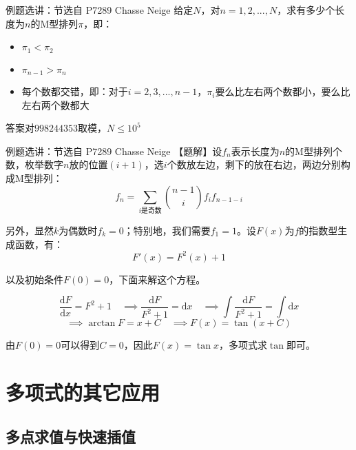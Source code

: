 \documentclass{beamer}
\begin{document}
\begin{frame}{例题选讲：节选自 P7289 Chasse Neige}
    \small
    给定$N$，对$n=1,2,...,N$，求有多少个长度为$n$的M型排列$\pi$，即：
    \begin{itemize}
        \item $\pi_1<\pi_2$
        \item $\pi_{n-1}>\pi_n$
        \item 每个数都交错，即：对于$i=2,3,...,n-1$，$\pi_i$要么比左右两个数都小，要么比左右两个数都大
    \end{itemize}

    答案对$998244353$取模，$N\leq 10^5$
\end{frame}

\begin{frame}{例题选讲：节选自 P7289 Chasse Neige}
    \small
    【题解】设$f_n$表示长度为$n$的M型排列个数\pause，枚举数字$n$放的位置$(i+1)$，选$i$个数放左边，剩下的放在右边，两边分别构成M型排列：
    \begin{equation*}
        f_n = \sum_{i \text{是奇数}} \binom{n-1}{i}f_i f_{n-1-i}
    \end{equation*}

    另外，显然$k$为偶数时$f_k=0$；特别地，我们需要$f_1=1$。\pause 设$F(x)$为$f$的指数型生成函数，有：
    \begin{equation*}
        F'(x)=F^2(x)+1
    \end{equation*}

    以及初始条件$F(0)=0$，下面来解这个方程。

    \pause
    \begin{equation*}
        \frac{\text{d} F}{\text{d}x}=F^2+1 \quad \implies \frac{\text{d} F}{F^2+1}=\text{d}x \quad \implies \int \frac{\text{d} F}{F^2+1}= \int \text{d}x
    \end{equation*}
    \pause
    \begin{equation*}
        \implies \arctan F = x+C \quad \implies F(x)=\tan(x+C)
    \end{equation*}

    由$F(0)=0$可以得到$C=0$，因此$F(x)=\tan x$，多项式求$\tan$即可。
\end{frame}


\section{多项式的其它应用}

\subsection{多点求值与快速插值}
\end{document}
